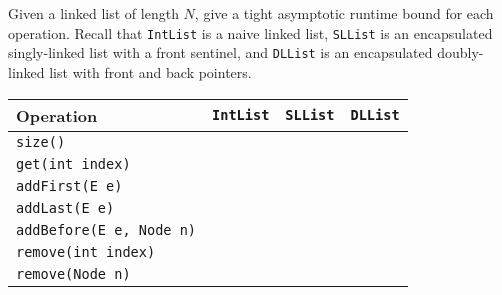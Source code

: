 \begin{blocksection}
\question

Given a linked list of length $N$, give a tight asymptotic runtime
bound for each operation. Recall that \lstinline$IntList$ is a naive linked
list, \lstinline$SLList$ is an encapsulated singly-linked list with a front
sentinel, and \lstinline$DLList$ is an encapsulated doubly-linked list with
front and back pointers.
\end{blocksection}

\ifprintanswers\else
\renewcommand{\arraystretch}{2}
\setlength{\tabcolsep}{16pt}
\begin{tabularx}{\textwidth}{Xccc}
Operation                          & \lstinline$IntList$ & \lstinline$SLList$ & \lstinline$DLList$ \\ \hline
\lstinline$size()$                 &                     &                    &                    \\
\lstinline$get(int index)$         &                     &                    &                    \\
\lstinline$addFirst(E e)$          &                     &                    &                    \\
\lstinline$addLast(E e)$           &                     &                    &                    \\
\lstinline$addBefore(E e, Node n)$ &                     &                    &                    \\
\lstinline$remove(int index)$      &                     &                    &                    \\
\lstinline$remove(Node n)$         &                     &                    &                    \\
\end{tabularx}
\fi

